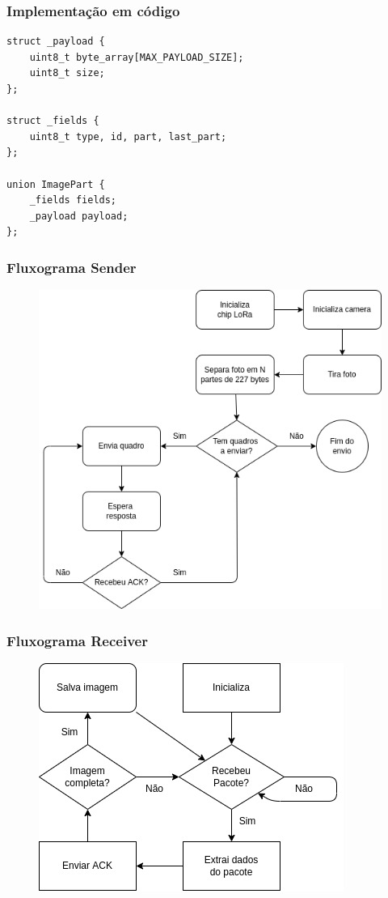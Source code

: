 \documentclass[12pt]{beamer}
\begin{document}
\begin{frame}[t,fragile]
    \frametitle{Implementação em código}
    \centering
    \begin{lstlisting}[basicstyle=\small]
struct _payload {
    uint8_t byte_array[MAX_PAYLOAD_SIZE];
    uint8_t size;
};

struct _fields {
    uint8_t type, id, part, last_part;
};

union ImagePart {
    _fields fields;
    _payload payload;
};
    \end{lstlisting}
\end{frame}

\begin{frame}
    \frametitle{Fluxograma Sender}
    \begin{figure}[!h]
        \centering
        \includegraphics[width=.7\textwidth]{fluxogram_sender}
    \end{figure}
\end{frame}

\begin{frame}
    \frametitle{Fluxograma Receiver}
    \begin{figure}[!h]
        \centering
        \includegraphics[width=.7\textwidth]{fluxogram_recivier}
    \end{figure}
\end{frame}
\end{document}
